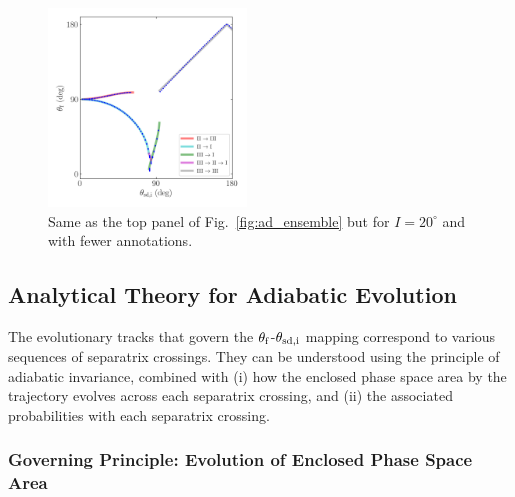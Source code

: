 \documentclass[twocolumn,twocolappendix]{aastex63}
\begin{document}
\begin{figure}
    \centering
    \includegraphics[width=0.47\textwidth]{plots_diskdisp/3_ensemble_20_35.png}
    \caption{Same as the top panel of Fig.~\ref{fig:ad_ensemble} but for $I
    = 20^\circ$ and with fewer annotations.}\label{fig:3_ensemble_20_35}
\end{figure}

\subsection{Analytical Theory for Adiabatic Evolution}\label{ss:zone_transitions}

The evolutionary tracks that govern the $\theta_{\rm f}$-$\theta_{\rm sd, i}$
mapping correspond to various sequences of separatrix crossings. They can be
understood using the principle of adiabatic invariance, combined with (i) how
the enclosed phase space area by the trajectory evolves across each separatrix
crossing, and (ii) the associated probabilities with each separatrix crossing.

\subsubsection{Governing Principle: Evolution of Enclosed Phase Space
Area}\label{sss:a_evo}
\end{document}
